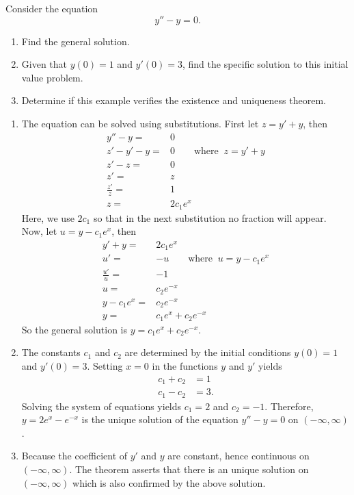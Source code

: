 \begin{example}
Consider the equation
\[y''-y=0.\]

\begin{enumerate}
  \item Find the general solution.
\item Given that $y(0)=1$ and $y'(0)=3$, find the specific solution to this initial value problem.
\item Determine if this example verifies the existence and uniqueness theorem.
\end{enumerate}
\end{example}
\begin{solution}
  \begin{enumerate}
    \item The equation can be solved using substitutions. First let $z=y'+y$, then
    \[\begin{aligned}
      y''-y=&0\\
      z'-y'-y=&0 \qquad \text{where }~  z=y'+y\\
      z'-z=&0\\
      z'=&z\\
      \frac{z'}{z}=&1\\
      z=&2c_1e^{x}
      \end{aligned}
      \]
      Here, we use $2c_1$ so that in the next substitution no fraction will appear.
      Now, let $u = y- c_1e^{x}$, then
      \[
      \begin{aligned}
      y'+y=&2c_1e^{x}\\
      u'=&-u\qquad\text{where }~ u = y- c_1e^{x} \\
      \frac{u'}{u}=&-1\\
      u=&c_2e^{-x}\\
      y-c_1e^x=&c_2e^{-x}\\
      y=&c_1e^x+c_2e^{-x}
    \end{aligned}
    \]
    So the general solution is $y=c_1e^x+c_2e^{-x}$.

    \item The constants $c_1$ and $c_2$ are determined by the initial conditions $y(0)=1$ and $y'(0)=3$.
    Setting $x=0$ in the functions $y$ and $y'$ yields
    \[
      \begin{aligned}
        c_1+c_2&=1\\ c_1-c_2&=3.
      \end{aligned}
    \]
    Solving the system of equations yields $c_1=2$ and $c_2=-1$. Therefore, $y=2e^x-e^{-x}$ is the unique solution of the equation $y''-y=0$ on $(-\infty,\infty)$.
    
    \item Because the coefficient of $y'$ and $y$ are constant, hence continuous on $(-\infty,\infty)$. The theorem asserts that there is an unique solution on $(-\infty, \infty)$ which is also confirmed by the above solution.
  \end{enumerate}
\end{solution}

